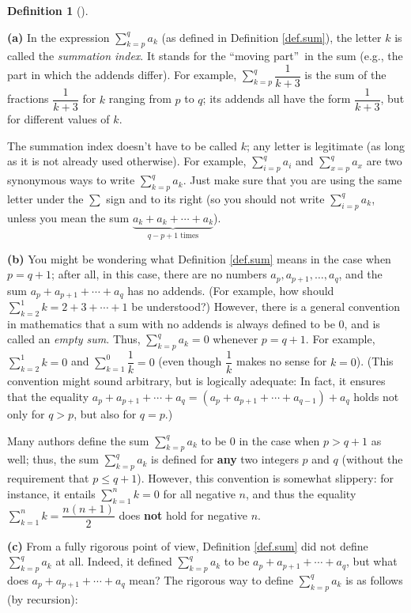 \documentclass[numbers=enddot,12pt,final,onecolumn,notitlepage]{scrartcl}%
\theoremstyle{definition}
\newtheorem{defi}[theo]{Definition}
\newenvironment{definition}[1][]
{\begin{defi}[#1]\begin{leftbar}}
{\end{leftbar}\end{defi}}
\let\sumnonlimits\sum
\renewcommand{\sum}{\sumnonlimits\limits}
\begin{document}
\begin{definition}
\label{def.sum.2}\textbf{(a)} In the expression $\sum_{k=p}^{q}a_{k}$ (as
defined in Definition \ref{def.sum}), the letter $k$ is called the
\textit{summation index}. It stands for the \textquotedblleft moving
part\textquotedblright\ in the sum (e.g., the part in which the addends
differ). For example, $\sum_{k=p}^{q}\dfrac{1}{k+3}$ is the sum of the
fractions $\dfrac{1}{k+3}$ for $k$ ranging from $p$ to $q$; its addends all
have the form $\dfrac{1}{k+3}$, but for different values of $k$.

The summation index doesn't have to be called $k$; any letter is legitimate
(as long as it is not already used otherwise). For example, $\sum_{i=p}%
^{q}a_{i}$ and $\sum_{x=p}^{q}a_{x}$ are two synonymous ways to write
$\sum_{k=p}^{q}a_{k}$. Just make sure that you are using the same letter under
the $\sum$ sign and to its right (so you should not write $\sum_{i=p}^{q}%
a_{k}$, unless you mean the sum $\underbrace{a_{k}+a_{k}+\cdots+a_{k}%
}_{q-p+1\text{ times}}$).

\textbf{(b)} You might be wondering what Definition \ref{def.sum} means in the
case when $p=q+1$; after all, in this case, there are no numbers
$a_{p},a_{p+1},\ldots,a_{q}$, and the sum $a_{p}+a_{p+1}+\cdots+a_{q}$ has no
addends. (For example, how should $\sum_{k=2}^{1}k=2+3+\cdots+1$ be
understood?) However, there is a general convention in mathematics that a sum
with no addends is always defined to be $0$, and is called an \textit{empty
sum}. Thus, $\sum_{k=p}^{q}a_{k}=0$ whenever $p=q+1$. For example, $\sum
_{k=2}^{1}k=0$ and $\sum_{k=1}^{0}\dfrac{1}{k}=0$ (even though $\dfrac{1}{k}$
makes no sense for $k=0$). (This convention might sound arbitrary, but is
logically adequate: In fact, it ensures that the equality $a_{p}%
+a_{p+1}+\cdots+a_{q}=\left(  a_{p}+a_{p+1}+\cdots+a_{q-1}\right)  +a_{q}$
holds not only for $q>p$, but also for $q=p$.)

Many authors define the sum $\sum_{k=p}^{q}a_{k}$ to be $0$ in the case when
$p>q+1$ as well; thus, the sum $\sum_{k=p}^{q}a_{k}$ is defined for
\textbf{any} two integers $p$ and $q$ (without the requirement that $p\leq
q+1$). However, this convention is somewhat slippery: for instance, it entails
$\sum_{k=1}^{n}k=0$ for all negative $n$, and thus the equality $\sum
_{k=1}^{n}k=\dfrac{n\left(  n+1\right)  }{2}$ does \textbf{not} hold for
negative $n$.

\textbf{(c)} From a fully rigorous point of view, Definition \ref{def.sum} did
not define $\sum_{k=p}^{q}a_{k}$ at all. Indeed, it defined $\sum_{k=p}%
^{q}a_{k}$ to be $a_{p}+a_{p+1}+\cdots+a_{q}$, but what does $a_{p}%
+a_{p+1}+\cdots+a_{q}$ mean? The rigorous way to define $\sum_{k=p}^{q}a_{k}$
is as follows (by recursion):


\end{definition}
\end{document}
